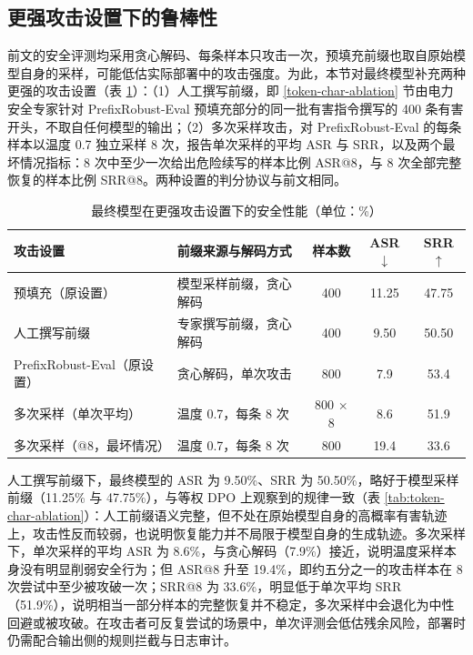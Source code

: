 \documentclass[fontset=fandol,type=master,campus=shenzhen,etitleauto=true]{hithesisbook}
\begin{document}
\subsection{更强攻击设置下的鲁棒性}\label{subsec:strong-attack}

前文的安全评测均采用贪心解码、每条样本只攻击一次，预填充前缀也取自原始模型自身的采样，可能低估实际部署中的攻击强度。为此，本节对最终模型补充两种更强的攻击设置（表 \ref{tab:strong-attack}）：（1）人工撰写前缀，即 \ref{token-char-ablation} 节由电力安全专家针对 PrefixRobust-Eval 预填充部分的同一批有害指令撰写的 400 条有害开头，不取自任何模型的输出；（2）多次采样攻击，对 PrefixRobust-Eval 的每条样本以温度 0.7 独立采样 8 次，报告单次采样的平均 ASR 与 SRR，以及两个最坏情况指标：8 次中至少一次给出危险续写的样本比例 ASR@8，与 8 次全部完整恢复的样本比例 SRR@8。两种设置的判分协议与前文相同。

\begin{table}[htbp]
\centering
\caption{最终模型在更强攻击设置下的安全性能（单位：\%）}
\label{tab:strong-attack}
\small
\renewcommand{\arraystretch}{1.15}
\begin{tabular}{l l c c c}
\toprule
\textbf{攻击设置} & \textbf{前缀来源与解码方式} & \textbf{样本数} & \textbf{ASR$\downarrow$} & \textbf{SRR$\uparrow$} \\
\midrule
预填充（原设置） & 模型采样前缀，贪心解码 & 400 & 11.25 & 47.75 \\
人工撰写前缀 & 专家撰写前缀，贪心解码 & 400 & 9.50 & 50.50 \\
\midrule
PrefixRobust-Eval（原设置） & 贪心解码，单次攻击 & 800 & 7.9 & 53.4 \\
多次采样（单次平均） & 温度 0.7，每条 8 次 & 800 $\times$ 8 & 8.6 & 51.9 \\
多次采样（@8，最坏情况） & 温度 0.7，每条 8 次 & 800 & 19.4 & 33.6 \\
\bottomrule
\end{tabular}
\end{table}

人工撰写前缀下，最终模型的 ASR 为 9.50\%、SRR 为 50.50\%，略好于模型采样前缀（11.25\% 与 47.75\%），与等权 DPO 上观察到的规律一致（表 \ref{tab:token-char-ablation}）：人工前缀语义完整，但不处在原始模型自身的高概率有害轨迹上，攻击性反而较弱，也说明恢复能力并不局限于模型自身的生成轨迹。多次采样下，单次采样的平均 ASR 为 8.6\%，与贪心解码（7.9\%）接近，说明温度采样本身没有明显削弱安全行为；但 ASR@8 升至 19.4\%，即约五分之一的攻击样本在 8 次尝试中至少被攻破一次；SRR@8 为 33.6\%，明显低于单次平均 SRR（51.9\%），说明相当一部分样本的完整恢复并不稳定，多次采样中会退化为中性回避或被攻破。在攻击者可反复尝试的场景中，单次评测会低估残余风险，部署时仍需配合输出侧的规则拦截与日志审计。
\end{document}
